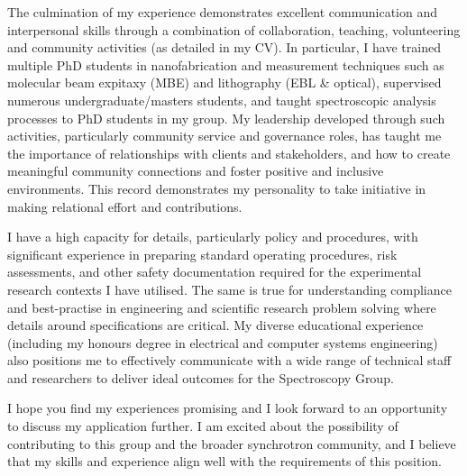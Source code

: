 \documentclass[10pt,a4paper,ragged2e,withhyper,paragraphstrue]{altacv}
\newcommand{\pind}{\hspace{24pt}}
\begin{document}
{    %
    \pind The culmination of my experience demonstrates excellent communication and interpersonal skills through a combination of collaboration, teaching, volunteering and community activities (as detailed in my CV). In particular, I have trained multiple PhD students in nanofabrication and measurement techniques such as molecular beam expitaxy (MBE) and lithography (EBL \& optical), supervised numerous undergraduate/masters students, and taught spectroscopic analysis processes to PhD students in my group. My leadership developed through such activities, particularly community service and governance roles, has taught me the importance of relationships with clients and stakeholders, and how to create meaningful community connections and foster positive and inclusive environments. This record demonstrates my personality to take initiative in making relational effort and contributions.

    \pind I have a high capacity for details, particularly policy and procedures, with significant experience in preparing standard operating procedures, risk assessments, and other safety documentation required for the experimental research contexts I have utilised. The same is true for understanding compliance and best-practise in engineering and scientific research problem solving where details around specifications are critical. My diverse educational experience (including my honours degree in electrical and computer systems engineering) also positions me to effectively communicate with a wide range of technical staff and researchers to deliver ideal outcomes for the Spectroscopy Group.

    I hope you find my experiences promising and I look forward to an opportunity to discuss my application further. I am excited about the possibility of contributing to this group and the broader synchrotron community, and I believe that my skills and experience align well with the requirements of this position.
    }
\end{document}
